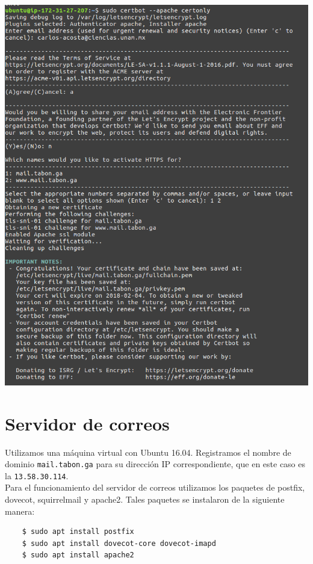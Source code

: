 \documentclass[9pt]{article}
\begin{document}
\begin{center}
\includegraphics[scale=0.3]{mail/2}
\end{center}

\newpage

\section{Servidor de correos}

Utilizamos una máquina virtual con Ubuntu 16.04. Registramos el nombre de dominio \texttt{mail.tabon.ga} para su dirección IP correspondiente, que en este caso es la \texttt{13.58.30.114}. \\
Para el funcionamiento del servidor de correos utilizamos los paquetes de \textsf{postfix}, \textsf{dovecot}, \textsf{squirrelmail} y \textsf{apache2}. Tales paquetes se instalaron de la siguiente manera: \\
\begin{verbatim}
    $ sudo apt install postfix
    $ sudo apt install dovecot-core dovecot-imapd
    $ sudo apt install apache2
\end{verbatim}
\end{document}
